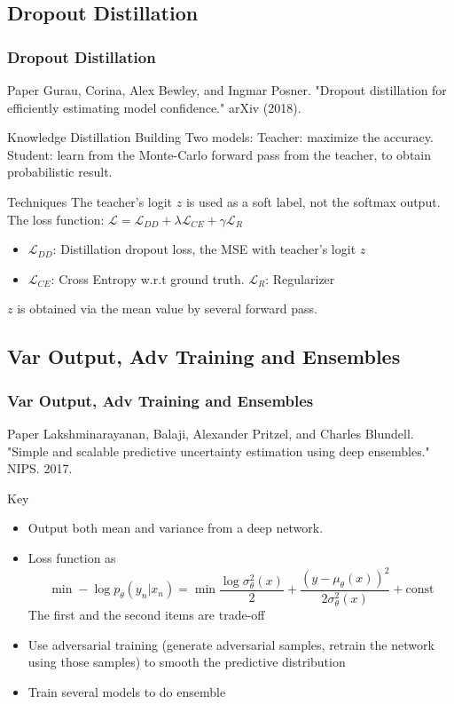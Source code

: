 \documentclass{beamer}
\begin{document}
\subsection{Dropout Distillation}
\begin{frame}
\frametitle{Dropout Distillation}
\begin{block}{Paper}
Gurau, Corina, Alex Bewley, and Ingmar Posner. "Dropout distillation for efficiently estimating model confidence." arXiv (2018).
\end{block}

\begin{block}{Knowledge Distillation}
Building Two models:
Teacher: maximize the accuracy.
Student: learn from the Monte-Carlo forward pass from the teacher, to obtain probabilistic result.
\end{block}

\begin{block}{Techniques}
The teacher's logit $z$ is used as a soft label, not the softmax output.
The loss function: $\mathcal{L} = \mathcal{L}_{DD} + \lambda \mathcal{L}_{CE} + \gamma \mathcal{L}_R$
\begin{itemize}
\setlength\itemsep{0em}
\item $\mathcal{L}_{DD}$: Distillation dropout loss, the MSE with teacher's logit $z$
\item $\mathcal{L}_{CE}$: Cross Entropy w.r.t ground truth. $\mathcal{L}_R$: Regularizer
\end{itemize}

$z$ is obtained via the mean value by several forward pass.
\end{block}
\end{frame}


\subsection{Var Output, Adv Training and Ensembles}
\begin{frame}
\frametitle{Var Output, Adv Training and Ensembles}
\begin{block}{Paper}
Lakshminarayanan, Balaji, Alexander Pritzel, and Charles Blundell. "Simple and scalable predictive uncertainty estimation using deep ensembles." NIPS. 2017.
\end{block}

\begin{block}{Key}
\begin{itemize}
\setlength\itemsep{0em}
\item Output both mean and variance from a deep network.
\item Loss function as
\[
\min -\log p_\theta (y_n|x_n) = \min \frac{\log \sigma_\theta^2(x)}{2} + \frac{(y-\mu_\theta(x))^2}{2\sigma_\theta^2(x)} + \text{const}
\]
The first and the second items are trade-off
\item Use adversarial training (generate adversarial samples, retrain the network using those samples) to smooth the predictive distribution
\item Train several models to do ensemble
\end{itemize}
\end{block}
\end{frame}
\end{document}
